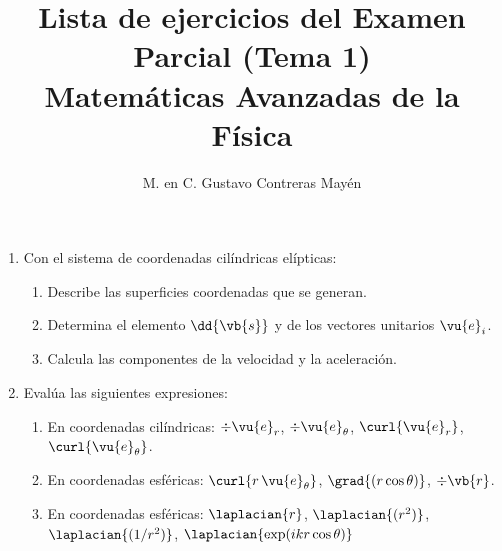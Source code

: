 

\title{Lista de ejercicios del Examen Parcial (Tema 1) \\[0.3em]  \large{Matemáticas Avanzadas de la Física}\vspace{-3ex}}
\author{M. en C. Gustavo Contreras Mayén}
\date{ }

\vspace{-4cm}
\maketitle

\fontsize{14}{14}\selectfont

\begin{enumerate}
\item Con el sistema de coordenadas cilíndricas elípticas:
\begin{enumerate}[label=\alph*)]
\item Describe las superficies coordenadas que se generan.
\item \label{inciso_1_b} Determina el elemento $\dd{\vb{s}}$ y de los vectores unitarios $\vu{e}_{i}$.
\item Calcula las componentes de la velocidad y la aceleración.
\end{enumerate}
\item Evalúa las siguientes expresiones:
\begin{enumerate}[label=\alph*)]
\item En coordenadas cilíndricas: $\div{\vu{e}_{r}}$, $\div{\vu{e}_{\theta}}$, $\curl{\vu{e}_{r}}$, $\curl{\vu{e}_{\theta}}$.
\item En coordenadas esféricas: $\curl{r \, \vu{e}_{\theta}}$, $\grad{(r \cos \theta)}$, $\div{\vb{r}}$.
\item En coordenadas esféricas: $\laplacian{r}$, $\laplacian{(r^{2})}$, $\laplacian{(1/r^{2})}$, $\laplacian{\exp(i k r \cos \theta)}$
\end{enumerate}

\end{enumerate}
